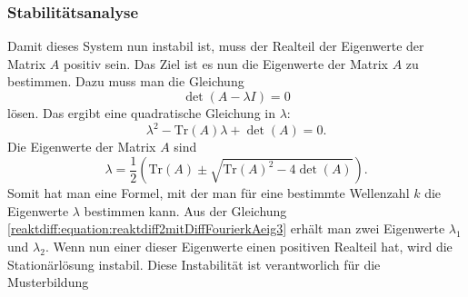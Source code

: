 
\subsubsection{Stabilitätsanalyse}
Damit dieses System nun instabil ist, muss der Realteil der Eigenwerte der Matrix \(A\) positiv sein.
Das Ziel ist es nun die Eigenwerte der Matrix \(A\) zu bestimmen.
Dazu muss man die Gleichung
\begin{equation}
    \det(A - \lambda I) = 0
\label{reaktdiff:equation:reaktdiff2mitDiffFourierkAeig}
\end{equation}
lösen.
Das ergibt eine quadratische Gleichung in \(\lambda\):
\begin{equation}
    \lambda^2 - \text{Tr}(A) \lambda + \det(A) = 0.
\label{reaktdiff:equation:reaktdiff2mitDiffFourierkAeig2}
\end{equation}
Die Eigenwerte der Matrix \(A\) sind
\begin{equation}
    \lambda = \frac{1}{2} \left( \text{Tr}(A) \pm 
    \sqrt{\text{Tr}(A)^2 - 4 \det(A)} \right).
\label{reaktdiff:equation:reaktdiff2mitDiffFourierkAeig3}
\end{equation}
Somit hat man eine Formel, mit der man für eine bestimmte Wellenzahl \(k\) die Eigenwerte \(\lambda\) bestimmen kann.
Aus der Gleichung \eqref{reaktdiff:equation:reaktdiff2mitDiffFourierkAeig3} erhält man zwei Eigenwerte \(\lambda_1\) und \(\lambda_2\).
Wenn nun einer dieser Eigenwerte einen positiven Realteil hat, wird die Stationärlösung instabil.
Diese Instabilität ist verantworlich für die Musterbildung


